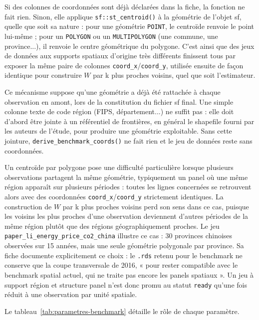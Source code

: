 \documentclass[11pt,a4paper]{article}
\begin{document}
Si des colonnes de coordonnées sont déjà déclarées dans la fiche, la fonction ne fait rien. Sinon, elle applique \texttt{sf::st\_centroid()} à la géométrie de l'objet sf, quelle que soit sa nature : pour une géométrie \texttt{POINT}, le centroïde renvoie le point lui-même ; pour un \texttt{POLYGON} ou un \texttt{MULTIPOLYGON} (une commune, une province...), il renvoie le centre géométrique du polygone. C'est ainsi que des jeux de données aux supports spatiaux d'origine très différents finissent tous par exposer la même paire de colonnes \texttt{coord\_x}/\texttt{coord\_y}, utilisée ensuite de façon identique pour construire $W$ par k plus proches voisins, quel que soit l'estimateur.

Ce mécanisme suppose qu'une géométrie a déjà été rattachée à chaque observation en amont, lors de la constitution du fichier sf final. Une simple colonne texte de code région (FIPS, département...) ne suffit pas : elle doit d'abord être jointe à un référentiel de frontières, en général le shapefile fourni par les auteurs de l'étude, pour produire une géométrie exploitable. Sans cette jointure, \texttt{derive\_benchmark\_coords()} ne fait rien et le jeu de données reste sans coordonnées.

Un centroïde par polygone pose une difficulté particulière lorsque plusieurs observations partagent la même géométrie, typiquement un panel où une même région apparaît sur plusieurs périodes : toutes les lignes concernées se retrouvent alors avec des coordonnées \texttt{coord\_x}/\texttt{coord\_y} strictement identiques. La construction de $W$ par k plus proches voisins perd son sens dans ce cas, puisque les voisins les plus proches d'une observation deviennent d'autres périodes de la même région plutôt que des régions géographiquement proches. Le jeu \texttt{paper\_li\_energy\_price\_co2\_china} illustre ce cas : 30 provinces chinoises observées sur 15 années, mais une seule géométrie polygonale par province. Sa fiche documente explicitement ce choix : le \texttt{.rds} retenu pour le benchmark ne conserve que la coupe transversale de 2016, « pour rester compatible avec le benchmark spatial actuel, qui ne traite pas encore les panels spatiaux ». Un jeu à support région et structure panel n'est donc promu au statut \texttt{ready} qu'une fois réduit à une observation par unité spatiale.

Le tableau~\ref{tab:parametres-benchmark} détaille le rôle de chaque paramètre.
\end{document}
